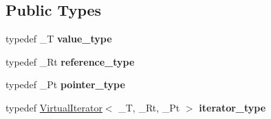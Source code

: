 \subsection*{Public Types}
\begin{DoxyCompactItemize}
\item 
typedef \+\_\+T {\bfseries value\+\_\+type}\hypertarget{classAudio_1_1VirtualMappingIterator_ad872298f300c45ff49177ec26c87ada1}{}\label{classAudio_1_1VirtualMappingIterator_ad872298f300c45ff49177ec26c87ada1}

\item 
typedef \+\_\+\+Rt {\bfseries reference\+\_\+type}\hypertarget{classAudio_1_1VirtualMappingIterator_a135d23a780707fd8729d95982d09615d}{}\label{classAudio_1_1VirtualMappingIterator_a135d23a780707fd8729d95982d09615d}

\item 
typedef \+\_\+\+Pt {\bfseries pointer\+\_\+type}\hypertarget{classAudio_1_1VirtualMappingIterator_a294812b491e18bbdf42b58b389a42b11}{}\label{classAudio_1_1VirtualMappingIterator_a294812b491e18bbdf42b58b389a42b11}

\item 
typedef \hyperlink{classAudio_1_1VirtualIterator}{Virtual\+Iterator}$<$ \+\_\+T, \+\_\+\+Rt, \+\_\+\+Pt $>$ {\bfseries iterator\+\_\+type}\hypertarget{classAudio_1_1VirtualMappingIterator_ae864f71875cc9dc423e287f6df49abe3}{}\label{classAudio_1_1VirtualMappingIterator_ae864f71875cc9dc423e287f6df49abe3}

\end{DoxyCompactItemize}
